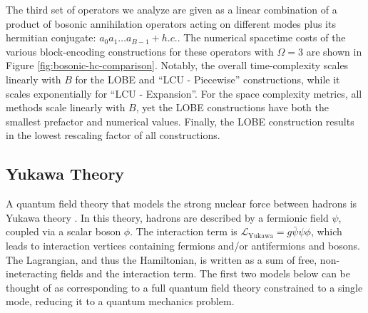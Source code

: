 The third set of operators we analyze are given as a linear combination of a product of bosonic annihilation operators acting on different modes plus its hermitian conjugate: $a_0 a_1 \hdots a_{B-1} + h.c.$.
The numerical spacetime costs of the various block-encoding constructions for these operators with $\Omega = 3$ are shown in Figure \ref{fig:bosonic-hc-comparison}.
Notably, the overall time-complexity scales linearly with $B$ for the LOBE and ``LCU - Piecewise'' constructions, while it scales exponentially for ``LCU - Expansion''.
For the space complexity metrics, all methods scale linearly with $B$, yet the LOBE constructions have both the smallest prefactor and numerical values.
Finally, the LOBE construction results in the lowest rescaling factor of all constructions.



\subsection{Yukawa Theory}
A quantum field theory that models the strong nuclear force between hadrons is Yukawa theory \cite{Peskin:1995ev}. In this theory, hadrons are described by a fermionic field $\psi$, coupled via a scalar boson $\phi$. The interaction term is $\mathcal{L}_{\text{Yukawa}} = g\bar\psi \psi \phi$, which leads to interaction vertices containing fermions and/or antifermions and bosons. The Lagrangian, and thus the Hamiltonian, is written as a sum of free, non-ineteracting fields and the interaction term.
The first two models below can be thought of as corresponding to a full quantum field theory constrained to a single mode, reducing it to a quantum mechanics problem.



